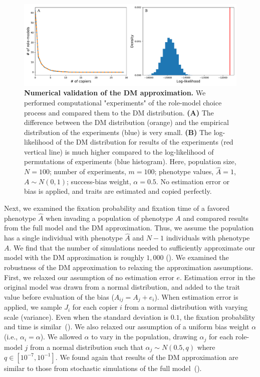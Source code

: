 \documentclass[12pt]{extarticle}
\begin{document}
\begin{figure}[h]
    \includegraphics[width=\linewidth]{../figures/final/DM_validation.pdf}
  \caption{
  \textbf{Numerical validation of the DM approximation.}
  We performed computational "experiments" of the role-model choice process and compared them to the DM distribution. 
  \textbf{(A)} The difference between the DM distribution (orange) and the empirical distribution of the experiments (blue) is very small. 
  \textbf{(B)} The log-likelihood of the DM distribution for results of the experiments (red vertical line) is much higher compared to the log-likelihood of permutations of experiments (blue histogram).
  Here, population size, $N=100$; number of experiments, $m=100$; phenotype values, $\hat{A}=1$, $A \sim N(0,1)$; success-bias weight, $\alpha=0.5$.
  No estimation error or bias is applied, and traits are estimated and copied perfectly.}	
  \label{fig:DM_validation}
\end{figure}


Next, we examined the fixation probability and fixation time of a favored phenotype $\hat{A}$ when invading a population of phenotype $A$ and compared results from the full model and the DM approximation.
Thus, we assume the population has a single individual with phenotype $\hat{A}$ and $N-1$ individuals with phenotype $A$. 
We find that the number of simulations needed to sufficiently approximate our model with the DM approximation is roughly $1,000$ ().
We examined the robustness of the DM approximation to relaxing the approximation assumptions.
First, we relaxed our assumption of no estimation error $e$.
Estimation error in the original model was drawn from a normal distribution, and added to the trait value before evaluation of the bias ($A_{ij} = A_j + e_i$).
When estimation error is applied, we sample $J_i$ for each copier $i$ from a normal distribution with varying scale (variance).
Even when the standard deviation is $0.1$, the fixation probability and time is similar~(). 
We also relaxed our assumption of a uniform bias weight $\alpha$ (i.e., $\alpha_i=\alpha$). We allowed $\alpha$ to vary in the population, drawing $\alpha_j$ for each role-model $j$ from a normal distribution such that $\alpha_j \sim N(0.5,q)$ where $q \in [10^{-7},10^{-1}]$. 
We found again that results of the DM approximation are similar to those from stochastic simulations of the full model~().
\end{document}
